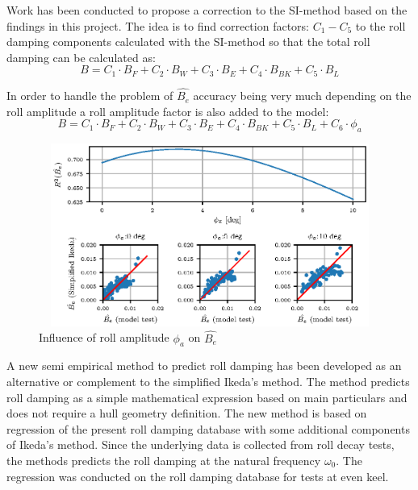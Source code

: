 Work has been conducted to propose a correction to the SI-method based on the findings in this project. The idea is to find correction factors: $C_1-C_5$ to the roll damping components calculated with the SI-method so that the total roll damping can be calculated as: 
\begin{equation} \label{eq:simplified_ikeda_equation}
B=C_1\cdot B_{F} + C_2 \cdot B_{W} + C_3 \cdot B_{E} + C_4 \cdot B_{BK} + C_5 \cdot B_{L} 
\label{eq:regression_model}
\end{equation}

In order to handle the problem of $\hat{B_e}$ accuracy being very much depending on the roll amplitude a roll amplitude factor is also added to the model:
\begin{equation} \label{eq:simplified_ikeda_equation}
B=C_1\cdot B_{F} + C_2 \cdot B_{W} + C_3 \cdot B_{E} + C_4 \cdot B_{BK} + C_5 \cdot B_{L} + C_6\cdot \phi_a 
\label{eq:regression_model_phi_a}
\end{equation}

\begin{figure}[H]
\vspace{-0.5cm}
\centering
  \centering
  \includegraphics[height=6cm, width = 14cm]{figures/ikeda_corrected_phi_a.eps}
  \vspace{-0.5cm}
  \caption{Influence of roll amplitude $\phi_a$ on $\hat{B_e}$}
  \label{fig:ikeda_phi_a}
\end{figure}




A new semi empirical method to predict roll damping has been developed as an alternative or complement to the simplified Ikeda's method. The method  predicts roll damping as a simple mathematical expression based on main particulars and does not require a hull geometry definition. 
The new method is based on regression of the present roll damping database with some additional components of Ikeda's method. Since the underlying data is collected from roll decay tests, the methods predicts the roll damping at the natural frequency $\omega_0$.  
The regression was conducted on the roll damping database for tests at even keel. 

